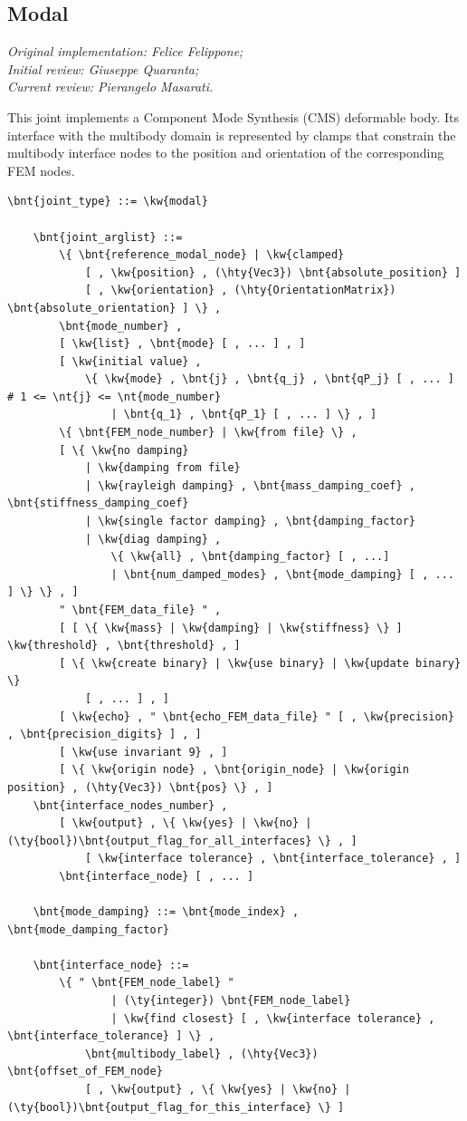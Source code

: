 \subsection{Modal}\label{sec:EL:STRUCT:JOINT:MODAL}
\emph{
Original implementation: Felice Felippone; \\
Initial review: Giuseppe Quaranta; \\
Current review: Pierangelo Masarati.}

This joint implements a Component Mode Synthesis (CMS) deformable body.
Its interface with the multibody domain is represented by clamps
that constrain the multibody interface nodes to the position
and orientation of the corresponding FEM nodes.
\begin{Verbatim}[commandchars=\\\{\}]
    \bnt{joint_type} ::= \kw{modal}

    \bnt{joint_arglist} ::=
        \{ \bnt{reference_modal_node} | \kw{clamped}
            [ , \kw{position} , (\hty{Vec3}) \bnt{absolute_position} ]
            [ , \kw{orientation} , (\hty{OrientationMatrix}) \bnt{absolute_orientation} ] \} ,
        \bnt{mode_number} ,
        [ \kw{list} , \bnt{mode} [ , ... ] , ]
        [ \kw{initial value} ,
            \{ \kw{mode} , \bnt{j} , \bnt{q_j} , \bnt{qP_j} [ , ... ]  # 1 <= \nt{j} <= \nt{mode_number}
                | \bnt{q_1} , \bnt{qP_1} [ , ... ] \} , ]
        \{ \bnt{FEM_node_number} | \kw{from file} \} ,
        [ \{ \kw{no damping}
            | \kw{damping from file}
            | \kw{rayleigh damping} , \bnt{mass_damping_coef} , \bnt{stiffness_damping_coef}
            | \kw{single factor damping} , \bnt{damping_factor}
            | \kw{diag damping} ,
                \{ \kw{all} , \bnt{damping_factor} [ , ...]
                | \bnt{num_damped_modes} , \bnt{mode_damping} [ , ... ] \} \} , ]
        " \bnt{FEM_data_file} " ,
        [ [ \{ \kw{mass} | \kw{damping} | \kw{stiffness} \} ] \kw{threshold} , \bnt{threshold} , ]
        [ \{ \kw{create binary} | \kw{use binary} | \kw{update binary} \}
            [ , ... ] , ]
        [ \kw{echo} , " \bnt{echo_FEM_data_file} " [ , \kw{precision} , \bnt{precision_digits} ] , ]
        [ \kw{use invariant 9} , ]
        [ \{ \kw{origin node} , \bnt{origin_node} | \kw{origin position} , (\hty{Vec3}) \bnt{pos} \} , ]
	\bnt{interface_nodes_number} ,
	    [ \kw{output} , \{ \kw{yes} | \kw{no} | (\ty{bool})\bnt{output_flag_for_all_interfaces} \} , ]
            [ \kw{interface tolerance} , \bnt{interface_tolerance} , ]
	    \bnt{interface_node} [ , ... ]

    \bnt{mode_damping} ::= \bnt{mode_index} , \bnt{mode_damping_factor}

    \bnt{interface_node} ::=
        \{ " \bnt{FEM_node_label} "
                | (\ty{integer}) \bnt{FEM_node_label}
                | \kw{find closest} [ , \kw{interface tolerance} , \bnt{interface_tolerance} ] \} ,
            \bnt{multibody_label} , (\hty{Vec3}) \bnt{offset_of_FEM_node}
	        [ , \kw{output} , \{ \kw{yes} | \kw{no} | (\ty{bool})\bnt{output_flag_for_this_interface} \} ]
\end{Verbatim}
